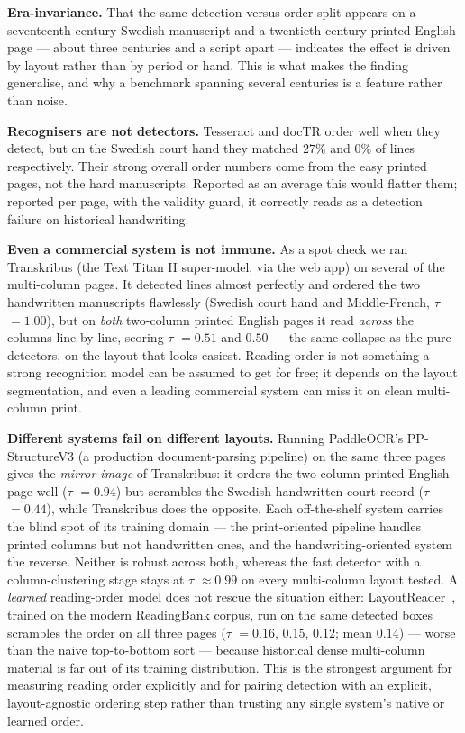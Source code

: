 \documentclass[11pt]{article}
\newcommand{\tw}{\ensuremath{\tau}}
\begin{document}
\textbf{Era-invariance.} That the same detection-versus-order split appears on a
seventeenth-century Swedish manuscript and a twentieth-century printed English
page --- about three centuries and a script apart --- indicates the effect is
driven by layout rather than by period or hand. This is what makes the finding
generalise, and why a benchmark spanning several centuries is a feature rather
than noise.

\textbf{Recognisers are not detectors.} Tesseract and docTR order well when they
detect, but on the Swedish court hand they matched $27\%$ and $0\%$ of lines
respectively. Their strong overall order numbers come from the easy printed pages,
not the hard manuscripts. Reported as an average this would flatter them; reported
per page, with the validity guard, it correctly reads as a detection failure on
historical handwriting.

\textbf{Even a commercial system is not immune.} As a spot check we ran
Transkribus (the Text Titan II super-model, via the web app) on several of the
multi-column pages. It detected lines almost perfectly and ordered the two
handwritten manuscripts flawlessly (Swedish court hand and Middle-French, \tw{}
$=1.00$), but on \emph{both} two-column printed English pages it read \emph{across}
the columns line by line, scoring \tw{} $=0.51$ and $0.50$ --- the same collapse
as the pure detectors, on the layout that looks easiest. Reading order is not
something a strong recognition model can be assumed to get for free; it depends on
the layout segmentation, and even a leading commercial system can miss it on clean
multi-column print.

\textbf{Different systems fail on different layouts.} Running PaddleOCR's
PP-StructureV3 (a production document-parsing pipeline) on the same three pages
gives the \emph{mirror image} of Transkribus: it orders the two-column printed
English page well (\tw{} $=0.94$) but scrambles the Swedish handwritten court
record (\tw{} $=0.44$), while Transkribus does the opposite. Each off-the-shelf
system carries the blind spot of its training domain --- the print-oriented
pipeline handles printed columns but not handwritten ones, and the
handwriting-oriented system the reverse. Neither is robust across both, whereas
the fast detector with a column-clustering stage stays at \tw{} $\approx 0.99$ on
every multi-column layout tested. A \emph{learned} reading-order model does not
rescue the situation either: LayoutReader~\cite{layoutreader}, trained on the
modern ReadingBank corpus, run on the same detected boxes scrambles the order on
all three pages (\tw{} $=0.16$, $0.15$, $0.12$; mean $0.14$) --- worse than the
naive top-to-bottom sort --- because historical dense multi-column material is far
out of its training distribution. This is the strongest argument for measuring
reading order explicitly and for pairing detection with an explicit, layout-agnostic
ordering step rather than trusting any single system's native or learned order.
\end{document}
